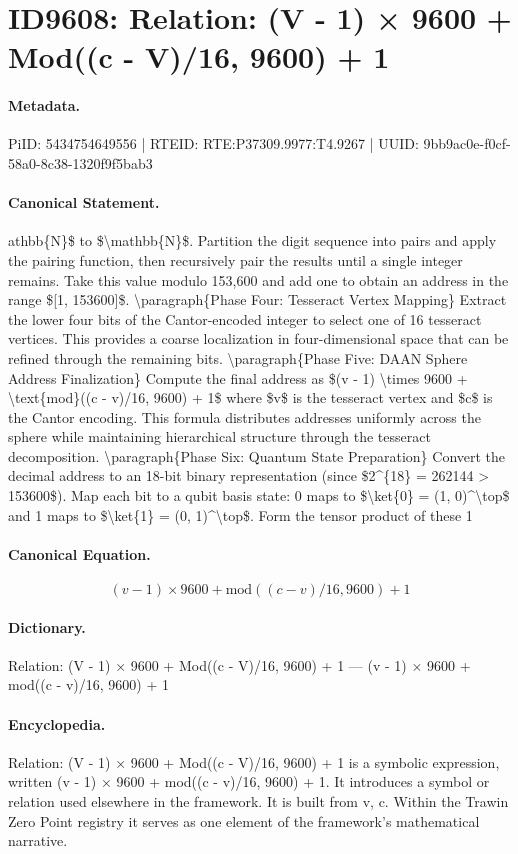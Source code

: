 \section*{ID9608: Relation: (V - 1) × 9600 + Mod((c - V)/16, 9600) + 1}
\paragraph{Metadata.}
PiID: 5434754649556 | RTEID: RTE:P37309.9977:T4.9267 | UUID: 9bb9ac0e-f0cf-58a0-8c38-1320f9f5bab3

\paragraph{Canonical Statement.}
athbb\{N\}\$ to \$\textbackslash{}mathbb\{N\}\$. Partition the digit sequence into pairs and apply the pairing function, then recursively pair the results until a single integer remains. Take this value modulo 153,600 and add one to obtain an address in the range \$[1, 153600]\$. \textbackslash{}paragraph\{Phase Four: Tesseract Vertex Mapping\} Extract the lower four bits of the Cantor-encoded integer to select one of 16 tesseract vertices. This provides a coarse localization in four-dimensional space that can be refined through the remaining bits. \textbackslash{}paragraph\{Phase Five: DAAN Sphere Address Finalization\} Compute the final address as \$(v - 1) \textbackslash{}times 9600 + \textbackslash{}text\{mod\}((c - v)/16, 9600) + 1\$ where \$v\$ is the tesseract vertex and \$c\$ is the Cantor encoding. This formula distributes addresses uniformly across the sphere while maintaining hierarchical structure through the tesseract decomposition. \textbackslash{}paragraph\{Phase Six: Quantum State Preparation\} Convert the decimal address to an 18-bit binary representation (since \$2\textasciicircum{}\{18\} = 262144 > 153600\$). Map each bit to a qubit basis state: 0 maps to \$\textbackslash{}ket\{0\} = (1, 0)\textasciicircum{}\textbackslash{}top\$ and 1 maps to \$\textbackslash{}ket\{1\} = (0, 1)\textasciicircum{}\textbackslash{}top\$. Form the tensor product of these 1

\paragraph{Canonical Equation.}
\[
(v - 1) \times 9600 + \text{mod}((c - v)/16, 9600) + 1
\]

\paragraph{Dictionary.}
Relation: (V - 1) × 9600 + Mod((c - V)/16, 9600) + 1 — (v - 1) × 9600 + mod((c - v)/16, 9600) + 1

\paragraph{Encyclopedia.}
Relation: (V - 1) × 9600 + Mod((c - V)/16, 9600) + 1 is a symbolic expression, written (v - 1) × 9600 + mod((c - v)/16, 9600) + 1. It introduces a symbol or relation used elsewhere in the framework. It is built from v, c. Within the Trawin Zero Point registry it serves as one element of the framework's mathematical narrative.
